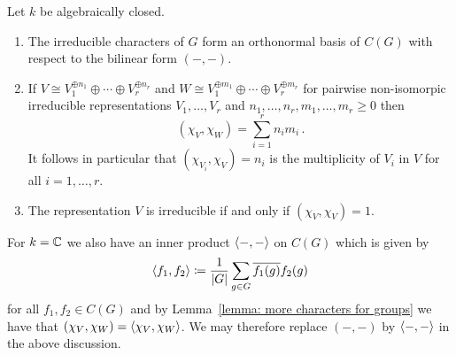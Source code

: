 

\begin{theorem}
  Let $k$ be algebraically closed.
  \begin{enumerate}
    \item
      The irreducible characters of $G$ form an orthonormal basis of $C(G)$ with respect to the bilinear form $(-,-)$.
    \item
      If $V \cong V_1^{\oplus n_1} \oplus \dotsb \oplus V_r^{\oplus n_r}$ and $W \cong V_1^{\oplus m_1} \oplus \dotsb \oplus V_r^{\oplus m_r}$ for pairwise non-isomorpic irreducible representations $V_1, \dotsc, V_r$ and $n_1, \dotsc, n_r, m_1, \dotsc, m_r \geq 0$ then
      \[
          (\chi_V, \chi_W)
        = \sum_{i=1}^r n_i m_i \,.
      \]
      It follows in particular that $(\chi_{V_i}, \chi_V) = n_i$ is the multiplicity of $V_i$ in $V$ for all $i = 1, \dotsc, r$.
    \item
      The representation $V$ is irreducible if and only if $(\chi_V, \chi_V) = 1$.
  \end{enumerate}
\end{theorem}






\begin{fluff}
  For $k = \mathbb{C}$ we also have an inner product $\langle -,- \rangle$ on $C(G)$ which is given by
  \[
              \langle f_1, f_2 \rangle
    \coloneqq  \frac{1}{|G|} \sum_{g \in G} \overline{f_1(g)} f_2(g)
  \]
  for all $f_1, f_2 \in C(G)$ and by Lemma~\ref{lemma: more characters for groups} we have that $(\chi_V, \chi_W) = \langle \chi_V, \chi_W \rangle$.
   We may therefore replace $(-,-)$ by $\langle -,- \rangle$ in the above discussion.
\end{fluff}




